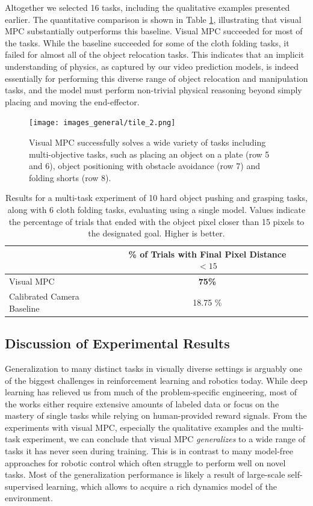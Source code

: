 Altogether we selected 16 tasks, including the qualitative examples presented earlier.
The quantitative comparison is shown in Table \ref{table:cloth_folding}, illustrating that visual MPC substantially outperforms this baseline.
Visual MPC succeeded for most of the tasks. While the baseline succeeded for some of the cloth folding tasks, it failed for almost all of the object relocation tasks. This indicates that an implicit understanding of physics, as captured by our video prediction models, is indeed essentially for performing this diverse range of object relocation and manipulation tasks, and the model must perform non-trivial physical reasoning beyond simply placing and moving the end-effector.


\begin{figure}
	\centering
	\texttt{[image: images\_general/tile\_2.png]}
	\caption{Visual MPC successfully solves a wide variety of tasks including multi-objective tasks, such as placing an object on a plate (row 5 and 6), object positioning with obstacle avoidance (row 7) and folding shorts (row 8).   
		\label{fig:tile_2}}
\end{figure}

\label{subsec:cloth_folding_data}
\begin{table}
\centering
{\footnotesize
\begin{tabular}{lcc}
	\toprule
         &  \thead{\% of Trials with \\ Final Pixel Distance $< 15$}   \\
         \midrule
  Visual MPC & \textbf{75\%} \\ 
  Calibrated Camera Baseline & 18.75 \% \\
  \bottomrule
\end{tabular}
}
\caption{Results for a multi-task experiment of 10 hard object pushing and grasping tasks, along with 6 cloth folding tasks, evaluating using a single model. Values indicate the percentage of trials that ended with the object pixel closer than 15 pixels to the designated goal. Higher is better.} 
\label{table:cloth_folding}
\end{table}

\subsection{Discussion of Experimental Results}

Generalization to many distinct tasks in visually diverse settings is arguably one of the biggest challenges in reinforcement learning and robotics today. While deep learning has relieved us from much of the problem-specific engineering, most of the works either require extensive amounts of labeled data or focus on the mastery of single tasks while relying on human-provided reward signals. 
From the experiments with visual MPC, especially the qualitative examples and the multi-task experiment, we can conclude that visual MPC \emph{generalizes} to a wide range of tasks it has never seen during training. This is in contrast to many model-free approaches for robotic control which often struggle to perform well on novel tasks. Most of the generalization performance is likely a result of large-scale self-supervised learning, which allows to acquire a rich dynamics model of the environment. 